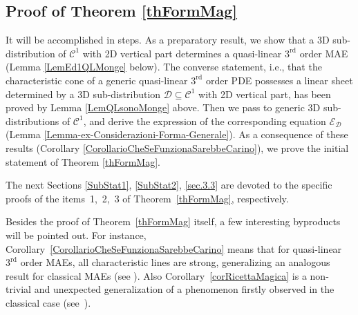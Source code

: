 \documentclass[pdftex]{sigma}
\newcommand{\C}{\mathcal{C}}
\newcommand{\D}{\mathcal{D}}
\newcommand{\E}{\mathcal{E}}
\newcommand{\Rd}{^\textrm{rd}}
\numberwithin{equation}{section}
\begin{document}
\subsection{Proof of Theorem \ref{thFormMag}}
It will be accomplished in steps. As a preparatory result, we show that a 3D sub-distribution of $\C^1$ with 2D vertical part determines a quasi-linear $3\Rd$ order MAE (Lemma \ref{LemEd1QLMonge} below). The converse statement, i.e., that the characteristic cone of a generic quasi-linear $3\Rd$ order PDE possesses a linear sheet determined by a 3D sub-distribution $\D\subseteq \C^1$ with 2D vertical part, has been proved by Lemma \ref{LemQLsonoMonge} above. Then we pass to generic 3D sub-distributions of $\C^1$, and derive the expression of the corresponding equation $\E_\D$ (Lemma \ref{Lemma-ex-Considerazioni-Forma-Generale}). As a consequence of these results (Corollary \ref{CorollarioCheSeFunzionaSarebbeCarino}), we prove the initial statement of Theorem \ref{thFormMag}.

The next Sections \ref{SubStat1}, \ref{SubStat2}, \ref{sec.3.3} are devoted to the specif\/ic proofs of the items~1,~2,~3 of Theorem~\ref{thFormMag}, respectively.

Besides the proof of Theorem~\ref{thFormMag} itself, a few interesting byproducts will be pointed out. For instance, Corollary~\ref{CorollarioCheSeFunzionaSarebbeCarino} means that for quasi-linear~$3\Rd$ order MAEs, all characteristic lines are strong, generalizing an analogous result for classical MAEs (see \cite[Theorem~3.7]{MR2985508}). Also Corollary~\ref{corRicettaMagica} is a non-trivial and unexpected generalization of a phenomenon f\/irstly observed in the classical case (see~\cite[Theorem~1.1]{MR2985508}).
\end{document}
